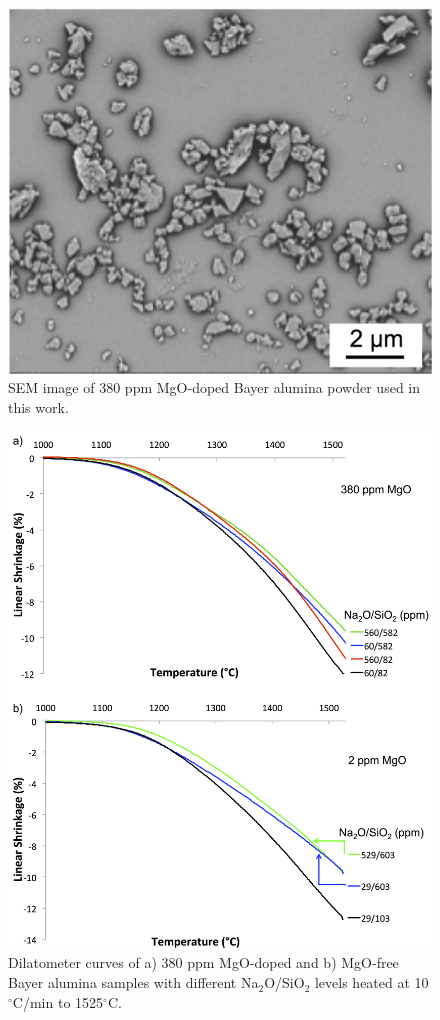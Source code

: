 \newpage
\begin{figure}[H]
	\centering
	\includegraphics{Chapter-3/Figures/Figure1.png}
	\caption{SEM image of 380 ppm MgO-doped Bayer alumina powder used in this work.}
	\label{Ch3-figure:Figure1}
\end{figure}

\newpage
\begin{figure}[H]
	\centering
	\includegraphics[width=\textwidth]{Chapter-3/Figures/Figure2.png}
	\caption{Dilatometer curves of a) 380 ppm MgO-doped and b) MgO-free \cite{Frueh2016a} Bayer alumina samples with different Na$_{2}$O/SiO$_{2}$ levels heated at 10$^{\circ}$C/min to 1525$^{\circ}$C.}
	\label{Ch3-figure:Figure2}
\end{figure}

